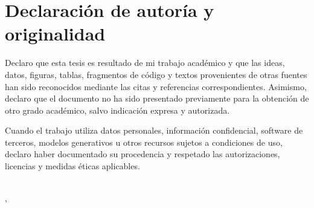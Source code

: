 \chapter*{Declaración de autoría y originalidad}

Declaro que esta tesis es resultado de mi trabajo académico y que las ideas,
datos, figuras, tablas, fragmentos de código y textos provenientes de otras
fuentes han sido reconocidos mediante las citas y referencias correspondientes.
Asimismo, declaro que el documento no ha sido presentado previamente para la
obtención de otro grado académico, salvo indicación expresa y autorizada.

Cuando el trabajo utiliza datos personales, información confidencial, software
de terceros, modelos generativos u otros recursos sujetos a condiciones de uso,
declaro haber documentado su procedencia y respetado las autorizaciones,
licencias y medidas éticas aplicables.

\vspace{2cm}
\noindent\makebox[\textwidth][c]{\rule{8.2cm}{0.4pt}}
\begin{center}
\textbf{\autorTesis}\\
\lugarPublicacion, \mesAnioPublicacion
\end{center}
